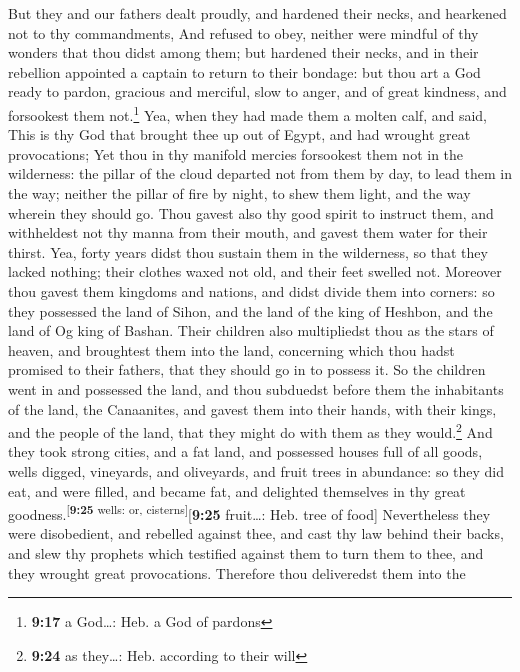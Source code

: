But they and our fathers dealt proudly, and hardened their necks, and
hearkened not to thy commandments,  And refused to obey,
neither were mindful of thy wonders that thou didst among them; but
hardened their necks, and in their rebellion appointed a captain to
return to their bondage: but thou art a God ready to pardon, gracious
and merciful, slow to anger, and of great kindness, and forsookest them
not.\footnote{\textbf{9:17} a God\ldots: Heb. a God of pardons}
 Yea, when they had made them a molten calf, and said,
This is thy God that brought thee up out of Egypt, and had wrought great
provocations;  Yet thou in thy manifold mercies
forsookest them not in the wilderness: the pillar of the cloud departed
not from them by day, to lead them in the way; neither the pillar of
fire by night, to shew them light, and the way wherein they should go.
 Thou gavest also thy good spirit to instruct them, and
withheldest not thy manna from their mouth, and gavest them water for
their thirst.  Yea, forty years didst thou sustain them
in the wilderness, so that they lacked nothing; their clothes waxed not
old, and their feet swelled not.  Moreover thou gavest
them kingdoms and nations, and didst divide them into corners: so they
possessed the land of Sihon, and the land of the king of Heshbon, and
the land of Og king of Bashan.  Their children also
multipliedst thou as the stars of heaven, and broughtest them into the
land, concerning which thou hadst promised to their fathers, that they
should go in to possess it.  So the children went in and
possessed the land, and thou subduedst before them the inhabitants of
the land, the Canaanites, and gavest them into their hands, with their
kings, and the people of the land, that they might do with them as they
would.\footnote{\textbf{9:24} as they\ldots: Heb. according to their
  will}  And they took strong cities, and a fat land, and
possessed houses full of all goods, wells digged, vineyards, and
oliveyards, and fruit trees in abundance: so they did eat, and were
filled, and became fat, and delighted themselves in thy great
goodness.\textsuperscript{{[}\textbf{9:25} wells: or,
cisterns{]}}{[}\textbf{9:25} fruit\ldots: Heb. tree of food{]}
 Nevertheless they were disobedient, and rebelled against
thee, and cast thy law behind their backs, and slew thy prophets which
testified against them to turn them to thee, and they wrought great
provocations.  Therefore thou deliveredst them into the

